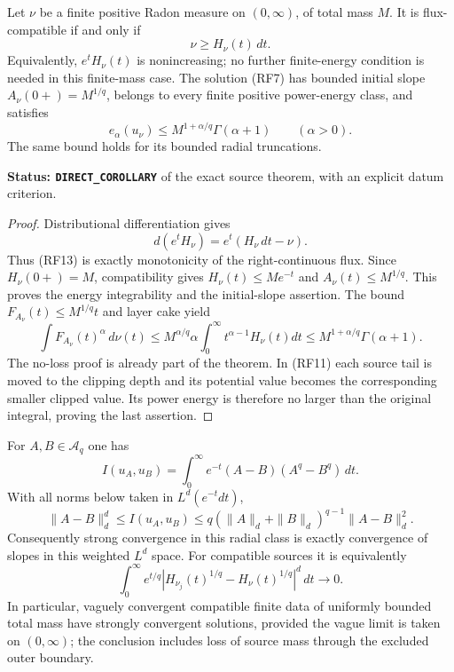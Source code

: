 \begin{corollary}
\label{cor:r12-finite-radial-data-compatibility}
Let $\nu$ be a finite positive Radon measure on $(0,\infty)$,
of total mass $M$.  It is flux-compatible if and only if
\[
                         \nu\ge H_\nu(t)\,dt.
 \tag{RF13}
\]
Equivalently, $e^tH_\nu(t)$ is nonincreasing; no further
finite-energy condition is needed in this finite-mass case.
The solution \textup{(RF7)} has bounded initial slope
$A_\nu(0+)=M^{1/q}$, belongs to every finite positive
power-energy class, and satisfies
\[
             e_\alpha(u_\nu)
                 \le M^{1+\alpha/q}\Gamma(\alpha+1)
                 \qquad(\alpha>0).
 \tag{RF14}
\]
The same bound holds for its bounded radial truncations.
\end{corollary}

\noindent\textbf{Status: \texttt{DIRECT\_COROLLARY}} of
the exact source theorem, with an explicit datum criterion.

\begin{proof}
Distributional differentiation gives
\[
                 d(e^tH_\nu)=e^t(H_\nu\,dt-\nu).
\]
Thus \textup{(RF13)} is exactly monotonicity of the
right-continuous flux.  Since $H_\nu(0+)=M$,
compatibility gives $H_\nu(t)\le Me^{-t}$ and
$A_\nu(t)\le M^{1/q}$.  This proves the energy
integrability and the initial-slope assertion.  The
bound $F_{A_\nu}(t)\le M^{1/q}t$ and layer cake yield
\[
 \int F_{A_\nu}(t)^\alpha\,d\nu(t)
 \le M^{\alpha/q}\alpha\int_0^\infty
                              t^{\alpha-1}H_\nu(t)dt
 \le M^{1+\alpha/q}\Gamma(\alpha+1).
\]
The no-loss proof is already part of the theorem.
In \textup{(RF11)} each source tail is moved to the
clipping depth and its potential value becomes the
corresponding smaller clipped value.  Its power
energy is therefore no larger than the original
integral, proving the last assertion.
\end{proof}

\begin{proposition}
\label{prop:r12-radial-flux-stability}
For $A,B\in\mathscr A_q$ one has
\[
 I(u_A,u_B)=\int_0^\infty
               e^{-t}(A-B)(A^q-B^q)\,dt.
 \tag{RF15}
\]
With all norms below taken in $L^d(e^{-t}dt)$,
\[
 \|A-B\|_d^d\le I(u_A,u_B)
   \le q(\|A\|_d+\|B\|_d)^{q-1}\|A-B\|_d^2.
 \tag{RF16}
\]
Consequently strong convergence in this radial class
is exactly convergence of slopes in this weighted
$L^d$ space.  For compatible sources it is equivalently
\[
 \int_0^\infty e^{t/q}
       |H_{\nu_j}(t)^{1/q}-H_\nu(t)^{1/q}|^d\,dt
                                                        \longrightarrow0.
 \tag{RF17}
\]
In particular, vaguely convergent compatible finite
data of uniformly bounded total mass have strongly
convergent solutions, provided the vague limit is
taken on $(0,\infty)$; the conclusion includes loss
of source mass through the excluded outer boundary.
\end{proposition}

